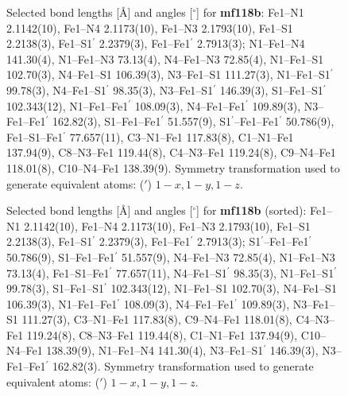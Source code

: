 \documentclass[a4paper]{scrartcl}
\begin{document}
\begin{figure}[ht]
\caption{ Selected bond lengths [\r{A}] and angles [$^{\circ}$] for \textbf{mf118b}: 
Fe1--N1 2.1142(10), Fe1--N4 2.1173(10), Fe1--N3 2.1793(10), Fe1--S1 2.2138(3), Fe1--S1$^{'}$ 2.2379(3), Fe1--Fe1$^{'}$ 2.7913(3); N1--Fe1--N4 141.30(4), N1--Fe1--N3 73.13(4), N4--Fe1--N3 72.85(4), N1--Fe1--S1 102.70(3), N4--Fe1--S1 106.39(3), N3--Fe1--S1 111.27(3), N1--Fe1--S1$^{'}$ 99.78(3), N4--Fe1--S1$^{'}$ 98.35(3), N3--Fe1--S1$^{'}$ 146.39(3), S1--Fe1--S1$^{'}$ 102.343(12), N1--Fe1--Fe1$^{'}$ 108.09(3), N4--Fe1--Fe1$^{'}$ 109.89(3), N3--Fe1--Fe1$^{'}$ 162.82(3), S1--Fe1--Fe1$^{'}$ 51.557(9), S1$^{'}$--Fe1--Fe1$^{'}$ 50.786(9), Fe1--S1--Fe1$^{'}$ 77.657(11), C3--N1--Fe1 117.83(8), C1--N1--Fe1 137.94(9), C8--N3--Fe1 119.44(8), C4--N3--Fe1 119.24(8), C9--N4--Fe1 118.01(8), C10--N4--Fe1 138.39(9). Symmetry transformation used to generate equivalent atoms: ($'$) $1-x, 1-y, 1-z$.}
\centering
\end{figure}
\begin{figure}[ht]
\caption{ Selected bond lengths [\r{A}] and angles [$^{\circ}$] for \textbf{mf118b} (sorted): 
Fe1--N1 2.1142(10), Fe1--N4 2.1173(10), Fe1--N3 2.1793(10), Fe1--S1 2.2138(3), Fe1--S1$^{'}$ 2.2379(3), Fe1--Fe1$^{'}$ 2.7913(3); S1$^{'}$--Fe1--Fe1$^{'}$ 50.786(9), S1--Fe1--Fe1$^{'}$ 51.557(9), N4--Fe1--N3 72.85(4), N1--Fe1--N3 73.13(4), Fe1--S1--Fe1$^{'}$ 77.657(11), N4--Fe1--S1$^{'}$ 98.35(3), N1--Fe1--S1$^{'}$ 99.78(3), S1--Fe1--S1$^{'}$ 102.343(12), N1--Fe1--S1 102.70(3), N4--Fe1--S1 106.39(3), N1--Fe1--Fe1$^{'}$ 108.09(3), N4--Fe1--Fe1$^{'}$ 109.89(3), N3--Fe1--S1 111.27(3), C3--N1--Fe1 117.83(8), C9--N4--Fe1 118.01(8), C4--N3--Fe1 119.24(8), C8--N3--Fe1 119.44(8), C1--N1--Fe1 137.94(9), C10--N4--Fe1 138.39(9), N1--Fe1--N4 141.30(4), N3--Fe1--S1$^{'}$ 146.39(3), N3--Fe1--Fe1$^{'}$ 162.82(3). Symmetry transformation used to generate equivalent atoms: ($'$) $1-x, 1-y, 1-z$.}
\centering
\end{figure}
\end{document}
